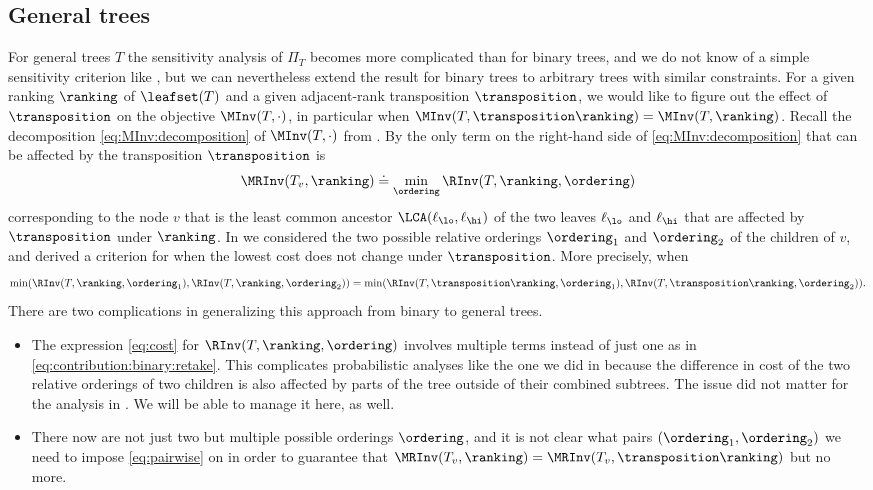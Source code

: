 \documentclass{toc}
\begin{document}
\subsection{General trees}
\label{sec:connectivity:general}

For general trees $T$ the sensitivity analysis of $\Pi_T$ becomes more complicated than for binary trees, and we do not know of a simple sensitivity criterion like , but we can nevertheless extend the result for binary trees to arbitrary trees with similar constraints. 
For a given ranking $\ranking$ of $\leafset(T)$ and a given adjacent-rank transposition $\transposition$, we would like to figure out the effect of $\transposition$ on the objective $\MInv(T,\cdot)$, in particular when $\MInv(T,\transposition \ranking) = \MInv(T,\ranking)$. Recall the decomposition \eqref{eq:MInv:decomposition} of $\MInv(T,\cdot)$ from . By  the only term on the right-hand side of \eqref{eq:MInv:decomposition} that can be affected by the transposition $\transposition$ is
\[ \MRInv(T_v,\ranking) \doteq \min_\ordering \RInv(T,\ranking,\ordering) \]
corresponding to the node $v$ that is the least common ancestor $\LCA(\ell_\lo,\ell_\hi)$ of the two leaves $\ell_\lo$ and $\ell_\hi$ that are affected by $\transposition$ under $\ranking$. In  we considered the two possible relative orderings $\ordering_1$ and $\ordering_2$ of the children of $v$, and derived a criterion for when the lowest cost does not change under $\transposition$. More precisely, when 
\begin{equation}\label{eq:pairwise}
\min(\RInv(T,\ranking,\ordering_1), \RInv(T,\ranking,\ordering_2)) = \min(\RInv(T,\transposition \ranking,\ordering_1), \RInv(T,\transposition \ranking,\ordering_2)). 
\end{equation}
There are two complications in generalizing this approach from binary to general trees.
\begin{itemize}
\item 
The expression \eqref{eq:cost} for $\RInv(T,\ranking,\ordering)$ involves multiple terms instead of just one as in \eqref{eq:contribution:binary:retake}. This complicates probabilistic analyses like the one we did in  because the difference in cost of the two relative orderings of two children is also affected by parts of the tree outside of their combined subtrees. The issue did not 
matter for the analysis in . We will be able to manage it here, as well.
\item There now are not just two but multiple possible orderings $\ordering$, and it is not clear what pairs $(\ordering_1,\ordering_2)$ we need to impose \eqref{eq:pairwise} on in order to guarantee that $\MRInv(T_v,\ranking) = \MRInv(T_v,\transposition \ranking)$ but no more.
\end{itemize}
\end{document}
